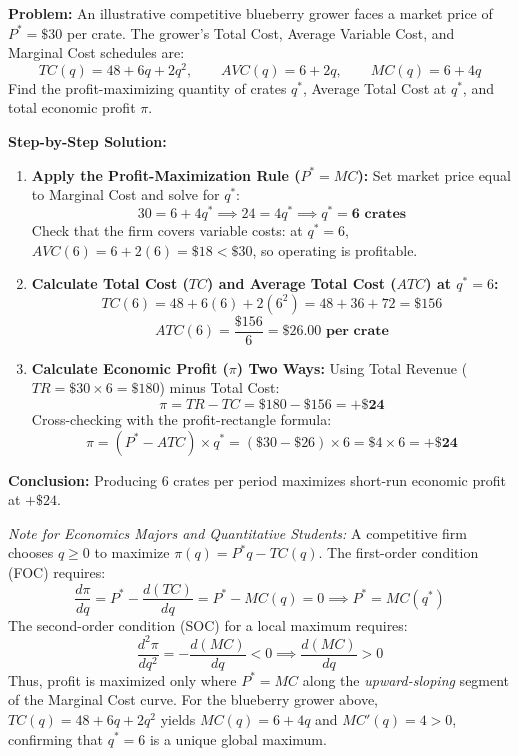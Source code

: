 \documentclass[11pt,letterpaper]{article}
\begin{document}
\begin{tcolorbox}[colback=LightSlate,colframe=SlateBlue,title=\textbf{Work It Out: Short-Run Profit Maximization for a Blueberry Grower}]
\noindent\textbf{Problem:} An illustrative competitive blueberry grower faces a market price of $P^* = \$30$ per crate. The grower's Total Cost, Average Variable Cost, and Marginal Cost schedules are:
\[
TC(q) = 48 + 6q + 2q^2, \qquad AVC(q) = 6 + 2q, \qquad MC(q) = 6 + 4q
\]
Find the profit-maximizing quantity of crates $q^*$, Average Total Cost at $q^*$, and total economic profit $\pi$.

\medskip
\noindent\textbf{Step-by-Step Solution:}
\begin{enumerate}
    \item \textbf{Apply the Profit-Maximization Rule ($P^* = MC$):}
    Set market price equal to Marginal Cost and solve for $q^*$:
    \[
    30 = 6 + 4q^* \implies 24 = 4q^* \implies q^* = \mathbf{6\text{ crates}}
    \]
    Check that the firm covers variable costs: at $q^* = 6$, $AVC(6) = 6 + 2(6) = \$18 < \$30$, so operating is profitable.

    \item \textbf{Calculate Total Cost ($TC$) and Average Total Cost ($ATC$) at $q^* = 6$:}
    \[
    TC(6) = 48 + 6(6) + 2(6^2) = 48 + 36 + 72 = \$156
    \]
    \[
    ATC(6) = \frac{\$156}{6} = \mathbf{\$26.00\text{ per crate}}
    \]

    \item \textbf{Calculate Economic Profit ($\pi$) Two Ways:}
    Using Total Revenue ($TR = \$30 \times 6 = \$180$) minus Total Cost:
    \[
    \pi = TR - TC = \$180 - \$156 = \mathbf{+\$24}
    \]
    Cross-checking with the profit-rectangle formula:
    \[
    \pi = (P^* - ATC) \times q^* = (\$30 - \$26) \times 6 = \$4 \times 6 = \mathbf{+\$24}
    \]
\end{enumerate}
\textbf{Conclusion:} Producing $6$ crates per period maximizes short-run economic profit at $+\$24$.
\end{tcolorbox}

\begin{tcolorbox}[colback=LightSlate,colframe=CourseBlue,title=\textbf{Optional Advanced Section: Calculus Conditions for Profit Maximization}]
\small
\emph{Note for Economics Majors and Quantitative Students:}
A competitive firm chooses $q \ge 0$ to maximize $\pi(q) = P^* q - TC(q)$. The first-order condition (FOC) requires:
\[
\frac{d\pi}{dq} = P^* - \frac{d(TC)}{dq} = P^* - MC(q) = 0 \implies P^* = MC(q^*)
\]
The second-order condition (SOC) for a local maximum requires:
\[
\frac{d^2\pi}{dq^2} = -\frac{d(MC)}{dq} < 0 \implies \frac{d(MC)}{dq} > 0
\]
Thus, profit is maximized only where $P^* = MC$ along the \emph{upward-sloping} segment of the Marginal Cost curve. For the blueberry grower above, $TC(q) = 48 + 6q + 2q^2$ yields $MC(q) = 6 + 4q$ and $MC'(q) = 4 > 0$, confirming that $q^* = 6$ is a unique global maximum.
\end{tcolorbox}
\end{document}
